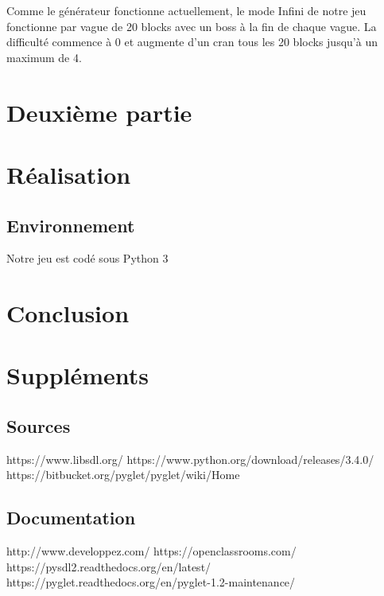 \documentclass{article}
\begin{document}
Comme le générateur fonctionne actuellement, le mode Infini de notre jeu fonctionne par vague de 20 blocks avec un boss à la fin de chaque vague. La difficulté commence à 0 et augmente d'un cran tous les 20 blocks jusqu'à un maximum de 4.

\section{Deuxième partie}



\section{Réalisation}

\subsection{Environnement}

Notre jeu est codé sous Python 3

\section{Conclusion}

\section{Suppléments}

\subsection{Sources}

\noindent https://www.libsdl.org/ \newline
https://www.python.org/download/releases/3.4.0/ \newline
https://bitbucket.org/pyglet/pyglet/wiki/Home

\subsection{Documentation}

\noindent http://www.developpez.com/ \newline
https://openclassrooms.com/ \newline
https://pysdl2.readthedocs.org/en/latest/ \newline
https://pyglet.readthedocs.org/en/pyglet-1.2-maintenance/
\end{document}
